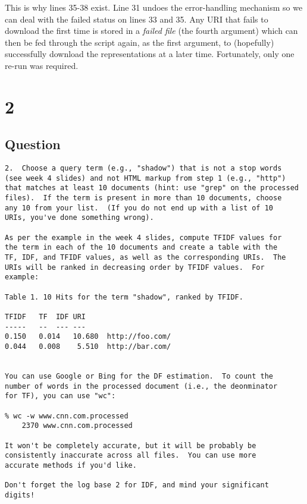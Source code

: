 \documentclass[letterpaper,11pt]{article}
\begin{document}
This is why lines 35-38 exist.  Line 31 undoes the error-handling mechanism so we can deal with the failed status on lines 33 and 35.  Any URI that fails to download the first time is stored in a \emph{failed file} (the fourth argument) which can then be fed through the script again, as the first argument, to (hopefully) successfully download the representations at a later time.  Fortunately, only one re-run was required.

\newpage


\newpage
\section*{2}

\subsection*{Question}

\begin{verbatim}
2.  Choose a query term (e.g., "shadow") that is not a stop words
(see week 4 slides) and not HTML markup from step 1 (e.g., "http")
that matches at least 10 documents (hint: use "grep" on the processed
files).  If the term is present in more than 10 documents, choose
any 10 from your list.  (If you do not end up with a list of 10
URIs, you've done something wrong).

As per the example in the week 4 slides, compute TFIDF values for
the term in each of the 10 documents and create a table with the
TF, IDF, and TFIDF values, as well as the corresponding URIs.  The
URIs will be ranked in decreasing order by TFIDF values.  For
example:

Table 1. 10 Hits for the term "shadow", ranked by TFIDF.

TFIDF	TF	IDF	URI
-----	--	---	---
0.150	0.014	10.680	http://foo.com/
0.044	0.008	 5.510	http://bar.com/


You can use Google or Bing for the DF estimation.  To count the
number of words in the processed document (i.e., the deonminator
for TF), you can use "wc":

% wc -w www.cnn.com.processed
    2370 www.cnn.com.processed

It won't be completely accurate, but it will be probably be
consistently inaccurate across all files.  You can use more 
accurate methods if you'd like.  

Don't forget the log base 2 for IDF, and mind your significant
digits!
\end{verbatim}
\end{document}
